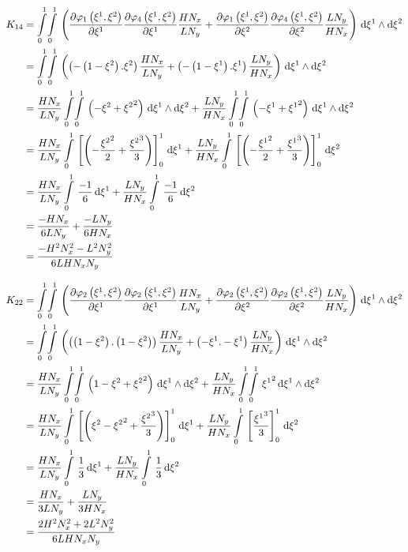 \begin{equation}
  \begin{aligned}
    K_{14}&=\giint{0}{1}{0}{1}{\pbrac{\delby{\lbfn{1}{\xione,\xitwo}}{\xione}\delby{\lbfn{4}{\xione,\xitwo}}{\xione}
        \dfrac{H N_{x}}{L N_{y}}+\delby{\lbfn{1}{\xione,\xitwo}}{\xitwo}\delby{\lbfn{4}{\xione,\xitwo}}{\xitwo}
        \dfrac{L N_{y}}{H N_{x}}}}{\xione}{\xitwo}\\
    &=\giint{0}{1}{0}{1}{\pbrac{\pbrac{-\pbrac{1-\xitwo}.\xitwo}\dfrac{H N_{x}}{L N_{y}}+
    \pbrac{-\pbrac{1-\xione}.\xione}\dfrac{L N_{y}}{H N_{x}}}}{\xione}{\xitwo} \\
    &=\dfrac{H N_{x}}{L N_{y}}\giint{0}{1}{0}{1}{\pbrac{-\xitwo+\xitwosq}}{\xione}{\xitwo}+
    \dfrac{L N_{y}}{H N_{x}}\giint{0}{1}{0}{1}{\pbrac{-\xione+\xionesq}}{\xione}{\xitwo} \\
    &=\dfrac{H N_{x}}{L N_{y}}\gint{0}{1}{\sqbrac{\pbrac{-\dfrac{\xitwosq}{2}+\dfrac{\xitwocube}{3}}}_{0}^{1}}{\xione}+
    \dfrac{L N_{y}}{H N_{x}}\gint{0}{1}{\sqbrac{\pbrac{-\dfrac{\xionesq}{2}+\dfrac{\xionecube}{3}}}_{0}^{1}}{\xitwo} \\
    &=\dfrac{H N_{x}}{L N_{y}}\gint{0}{1}{\dfrac{-1}{6}}{\xione}+\dfrac{L N_{y}}{H N_{x}}\gint{0}{1}{\dfrac{-1}{6}}{\xitwo} \\
    &=\dfrac{-H N_{x}}{6 L N_{y}}+\dfrac{-L N_{y}}{6 H N_{x}} \\
    &=\dfrac{-H^{2}N_{x}^{2}-L^{2}N_{y}^{2}}{6 L H N_{x} N_{y}}
  \end{aligned}
\end{equation}

\begin{equation}
  \begin{aligned}
    K_{22}&=\giint{0}{1}{0}{1}{\pbrac{\delby{\lbfn{2}{\xione,\xitwo}}{\xione}\delby{\lbfn{2}{\xione,\xitwo}}{\xione}
        \dfrac{H N_{x}}{L N_{y}}+\delby{\lbfn{2}{\xione,\xitwo}}{\xitwo}\delby{\lbfn{2}{\xione,\xitwo}}{\xitwo}
        \dfrac{L N_{y}}{H N_{x}}}}{\xione}{\xitwo}\\
    &=\giint{0}{1}{0}{1}{\pbrac{\pbrac{\pbrac{1-\xitwo}.\pbrac{1-\xitwo}}\dfrac{H N_{x}}{L N_{y}}+
    \pbrac{-\xione.-\xione}\dfrac{L N_{y}}{H N_{x}}}}{\xione}{\xitwo} \\
    &=\dfrac{H N_{x}}{L N_{y}}\giint{0}{1}{0}{1}{\pbrac{1-\xitwo+\xitwosq}}{\xione}{\xitwo}+
    \dfrac{L N_{y}}{H N_{x}}\giint{0}{1}{0}{1}{\xionesq}{\xione}{\xitwo} \\
    &=\dfrac{H N_{x}}{L N_{y}}\gint{0}{1}{\sqbrac{\pbrac{\xitwo-\xitwosq+\dfrac{\xitwocube}{3}}}_{0}^{1}}{\xione}+
    \dfrac{L N_{y}}{H N_{x}}\gint{0}{1}{\sqbrac{\dfrac{\xionecube}{3}}_{0}^{1}}{\xitwo} \\
    &=\dfrac{H N_{x}}{L N_{y}}\gint{0}{1}{\dfrac{1}{3}}{\xione}+\dfrac{L N_{y}}{H N_{x}}\gint{0}{1}{\dfrac{1}{3}}{\xitwo} \\
    &=\dfrac{H N_{x}}{3 L N_{y}}+\dfrac{L N_{y}}{3 H N_{x}} \\
    &=\dfrac{2 H^{2}N_{x}^{2}+2 L^{2}N_{y}^{2}}{6 L H N_{x} N_{y}}
  \end{aligned}
\end{equation}

